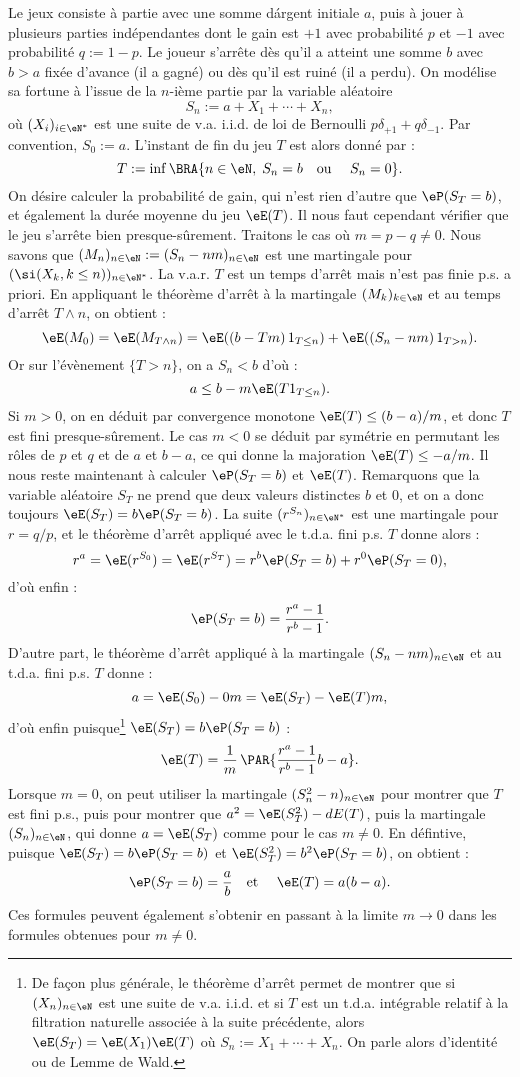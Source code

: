 Le jeux consiste à partie avec une somme dárgent initiale $a$, puis à
jouer à plusieurs parties indépendantes dont le gain est $+1$ avec
probabilité $p$ et $-1$ avec probabilité $q:=1-p$.  Le joueur s'arrête
dès qu'il a atteint une somme $b$ avec $b>a$ fixée d'avance (il a
gagné) ou dès qu'il est ruiné (il a perdu).  On modélise sa fortune à
l'issue de la $n$-ième partie par la variable aléatoire
$$
S_n:=a+X_1+\cdots+X_n,
$$
où $(X_i)_{i\in\eN^*}$ est une suite de v.a. i.i.d. de loi de
Bernoulli $p\delta_{+1}+q\delta_{-1}$. Par convention, $S_0:=a$.  L'instant
de fin du jeu $T$ est alors donné par :
$$
T:=\inf\BRA{n\in\eN,\; S_n=b \text{\quad ou \quad} S_n=0}.
$$
On désire calculer la probabilité de gain, qui n'est rien d'autre
que $\eP(S_T=b)$, et également la durée moyenne du jeu $\eE(T)$.  Il
nous faut cependant vérifier que le jeu s'arrête bien
presque-sûrement. Traitons le cas où $m=p-q\neq 0$. Nous savons que
$(M_n)_{n\in\eN}:=(S_n-nm)_{n\in\eN}$ est une martingale pour
$(\si(X_k,k\leq n))_{n\in\eN^*}$.  La v.a.r.  $T$ est un temps d'arrêt
mais n'est pas finie p.s. a priori.  En appliquant le théorème d'arrêt
à la martingale $(M_k)_{k\in\eN}$ et au temps d'arrêt $T\land n$, on
obtient :
$$
\eE(M_0)=\eE(M_{T\land n})
=\eE((b-Tm)\,\mathrm{1}_{T\leq n})+\eE((S_n-nm)\,\mathrm{1}_{T>n}).
$$
Or sur l'évènement $\{T>n\}$, on a $S_n<b$ d'où :
$$
a\leq b-m\eE(T\mathrm{1}_{T\leq n}).
$$
Si $m>0$, on en déduit par convergence monotone $\eE(T)\leq
(b-a)/m$, et donc $T$ est fini presque-sûrement. Le cas $m<0$ se
déduit par symétrie en permutant les rôles de $p$ et $q$ et de $a$ et
$b-a$, ce qui donne la majoration $\eE(T)\leq -a/m$.  Il nous reste
maintenant à calculer $\eP(S_T=b)$ et $\eE(T)$.  Remarquons que la
variable aléatoire $S_T$ ne prend que deux valeurs distinctes $b$ et
$0$, et on a donc toujours $\eE(S_T)=b\eP(S_T=b)$.  La suite
$(r^{S_n})_{n\in\eN^*}$ est une martingale pour $r=q/p$, et le
théorème d'arrêt appliqué avec le t.d.a. fini p.s. $T$ donne alors :
$$
r^a=\eE(r^{S_0})=\eE(r^{S_T})=r^b\eP(S_T=b)+r^0\eP(S_T=0),
$$
d'où enfin :
$$
\eP(S_T=b)=\frac{r^a-1}{r^b-1}.
$$
D'autre part, le théorème d'arrêt appliqué à la martingale 
$(S_n-nm)_{n\in\eN}$ et au t.d.a. fini p.s. $T$ donne :
$$
a=\eE(S_0)-0m=\eE(S_T)-\eE(T)m,
$$
d'où enfin puisque\footnote{De façon plus générale, le théorème
  d'arrêt permet de montrer que si $(X_n)_{n\in\eN}$ est une suite de
  v.a. i.i.d. et si $T$ est un t.d.a. intégrable relatif à la
  filtration naturelle associée à la suite précédente, alors
  $\eE(S_T)=\eE(X_1)\eE(T)$ où $S_n:=X_1+\cdots+X_n$. On parle alors
  d'identité ou de Lemme de Wald.}  $\eE(S_T)=b\eP(S_T=b)$ :
$$
\eE(T)=\frac{1}{m}\,\PAR{\frac{r^a-1}{r^b-1}b-a}.
$$
Lorsque $m=0$, on peut utiliser la martingale $(S_n^2-n)_{n\in\eN}$
pour montrer que $T$ est fini p.s., puis pour montrer que
$a^2=\eE(S_T^2)-dE(T)$, puis la martingale $(S_n)_{n\in\eN}$, qui
donne $a=\eE(S_T)$ comme pour le cas $m\neq 0$. En défintive, puisque
$\eE(S_T)=b\eP(S_T=b)$ et $\eE(S_T^2)=b^2\eP(S_T=b)$, on obtient :
$$
\eP(S_T=b)=\frac{a}{b}
\text{\quad et \quad} 
\eE(T)= a(b-a).
$$
Ces formules peuvent également s'obtenir en passant à la limite
$m\to0$ dans les formules obtenues pour $m\neq 0$.

